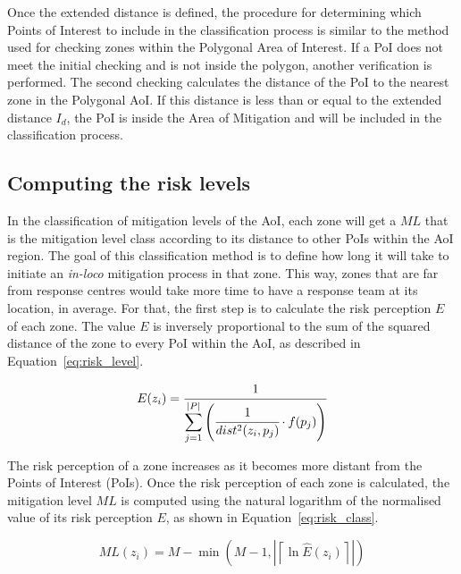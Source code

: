\begin{refsection}
Once the extended distance is defined, the procedure for determining which Points of Interest to include in the classification process is similar to the method used for checking zones within the Polygonal Area of Interest. If a PoI does not meet the initial checking and is not inside the polygon, another verification is performed. The second checking calculates the distance of the PoI to the nearest zone in the Polygonal AoI. If this distance is less than or equal to the extended distance $I_d$, the PoI is inside the Area of Mitigation and will be included in the classification process.

\subsection{Computing the risk levels}


In the classification of mitigation levels of the AoI, each zone will get a $ML$ that is the mitigation level class according to its distance to other PoIs within the AoI region. The goal of this classification method is to define how long it will take to initiate an \emph{in-loco} mitigation process in that zone. This way, zones that are far from response centres would take more time to have a response team at its location, in average. For that, the first step is to calculate the risk perception $E$ of each zone. The value $E$ is inversely proportional to the sum of the squared distance of the zone to every PoI within the AoI, as described in Equation~\ref{eq:risk_level}.

\begin{equation}
  \label{eq:risk_level}
  E(z_i) = \cfrac{1}{\displaystyle\sum_{j = 1}^{\lvert P \rvert}\left(\cfrac{1}{dist^2(z_i, p_j)} \cdot f(p_j)\right)} 
\end{equation}

The risk perception of a zone increases as it becomes more distant from the Points of Interest (PoIs). Once the risk perception of each zone is calculated, the mitigation level $ML$ is computed using the natural logarithm of the normalised value of its risk perception $E$, as shown in Equation~\ref{eq:risk_class}.

\begin{equation}
  \label{eq:risk_class}
  ML(z_i) = M - \min\left(M - 1, \left| \left\lceil \ln{\widehat{E}(z_i)} \right\rceil \right| \right)
\end{equation}


\end{refsection}
